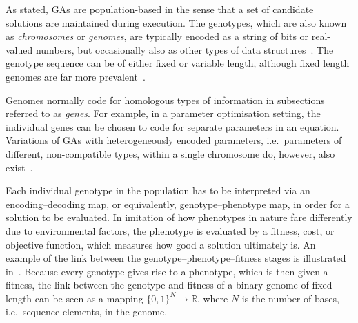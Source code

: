 \documentclass[a4paper,12pt]{article}
\theoremstyle{plain}
\theoremstyle{definition}
\begin{document}
      As stated, GAs are population-based in the sense that a set of candidate solutions 
      are maintained during execution. The genotypes, which are also known as 
      \textit{chromosomes} or \textit{genomes}, are typically encoded as a string of bits 
      or real-valued numbers, but occasionally also as other types of data structures~\cite[p.\ 60--82]{Goldberg_GA_book}. 
      The genotype sequence can be of either fixed or variable
      length, although fixed length genomes are far more prevalent~\cite{varlen,varlen2}.
      
      Genomes normally code for homologous types of information in
      subsections referred to as \textit{genes}. For example, in a
      parameter optimisation setting, the individual genes can be chosen to code
      for separate parameters in an equation. Variations of GAs
      with heterogeneously encoded parameters, i.e.\ parameters of different,
      non-compatible types, within a single chromosome do, however, also exist~\cite{HELGA}. 

      Each individual genotype in the population has to be interpreted via an 
      encoding--decoding map, or equivalently, genotype--phenotype map, in order 
      for a solution to be evaluated. In imitation of how
      phenotypes in nature fare differently due to environmental factors, the 
      phenotype is evaluated by a fitness, cost, or objective function,
      which measures how good a solution ultimately is. An example of the link between the
      genotype--phenotype--fitness stages is illustrated in~.
      Because every genotype gives rise to a phenotype, which is then given a
      fitness, the link between the genotype and fitness of a binary genome of
      fixed length can be seen as a mapping
      $\{0,1\}^N \rightarrow \mathbb{R}$, where $N$ is the number of bases,
      i.e.\ sequence elements, in the genome.
      
\end{document}
